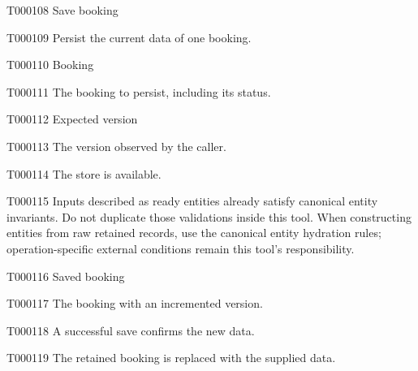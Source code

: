 \documentclass[11pt,a4paper]{article}
\begin{document}
\begin{atlastext}{T000108}
Save booking
\end{atlastext}
\begin{atlasparagraph}{T000109}
Persist the current data of one booking.
\end{atlasparagraph}
\begin{atlastext}{T000110}
Booking
\end{atlastext}
\begin{atlasparagraph}{T000111}
The booking to persist, including its status.
\end{atlasparagraph}
\begin{atlastext}{T000112}
Expected version
\end{atlastext}
\begin{atlasparagraph}{T000113}
The version observed by the caller.
\end{atlasparagraph}
\begin{atlasparagraph}{T000114}
The store is available.
\end{atlasparagraph}
\begin{atlasparagraph}{T000115}
Inputs described as ready entities already satisfy canonical entity invariants. Do not duplicate those validations inside this tool. When constructing entities from raw retained records, use the canonical entity hydration rules; operation-specific external conditions remain this tool's responsibility.
\end{atlasparagraph}
\begin{atlastext}{T000116}
Saved booking
\end{atlastext}
\begin{atlasparagraph}{T000117}
The booking with an incremented version.
\end{atlasparagraph}
\begin{atlasparagraph}{T000118}
A successful save confirms the new data.
\end{atlasparagraph}
\begin{atlasparagraph}{T000119}
The retained booking is replaced with the supplied data.
\end{atlasparagraph}
\end{document}

